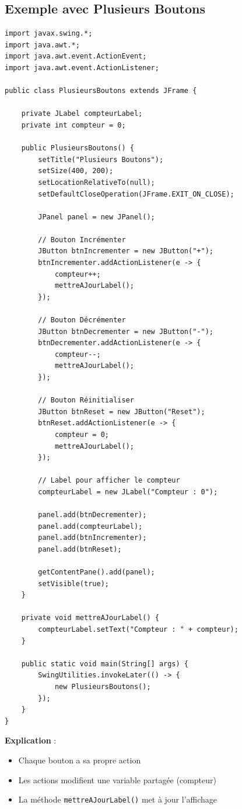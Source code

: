 \documentclass[11pt,a4paper]{article}
\begin{document}
\subsection{Exemple avec Plusieurs Boutons}

\begin{lstlisting}
import javax.swing.*;
import java.awt.*;
import java.awt.event.ActionEvent;
import java.awt.event.ActionListener;

public class PlusieursBoutons extends JFrame {
    
    private JLabel compteurLabel;
    private int compteur = 0;
    
    public PlusieursBoutons() {
        setTitle("Plusieurs Boutons");
        setSize(400, 200);
        setLocationRelativeTo(null);
        setDefaultCloseOperation(JFrame.EXIT_ON_CLOSE);
        
        JPanel panel = new JPanel();
        
        // Bouton Incrémenter
        JButton btnIncrementer = new JButton("+");
        btnIncrementer.addActionListener(e -> {
            compteur++;
            mettreAJourLabel();
        });
        
        // Bouton Décrémenter
        JButton btnDecrementer = new JButton("-");
        btnDecrementer.addActionListener(e -> {
            compteur--;
            mettreAJourLabel();
        });
        
        // Bouton Réinitialiser
        JButton btnReset = new JButton("Reset");
        btnReset.addActionListener(e -> {
            compteur = 0;
            mettreAJourLabel();
        });
        
        // Label pour afficher le compteur
        compteurLabel = new JLabel("Compteur : 0");
        
        panel.add(btnDecrementer);
        panel.add(compteurLabel);
        panel.add(btnIncrementer);
        panel.add(btnReset);
        
        getContentPane().add(panel);
        setVisible(true);
    }
    
    private void mettreAJourLabel() {
        compteurLabel.setText("Compteur : " + compteur);
    }
    
    public static void main(String[] args) {
        SwingUtilities.invokeLater(() -> {
            new PlusieursBoutons();
        });
    }
}
\end{lstlisting}

\textbf{Explication} :
\begin{itemize}
    \item Chaque bouton a sa propre action
    \item Les actions modifient une variable partagée (compteur)
    \item La méthode \texttt{mettreAJourLabel()} met à jour l'affichage
\end{itemize}
\end{document}
